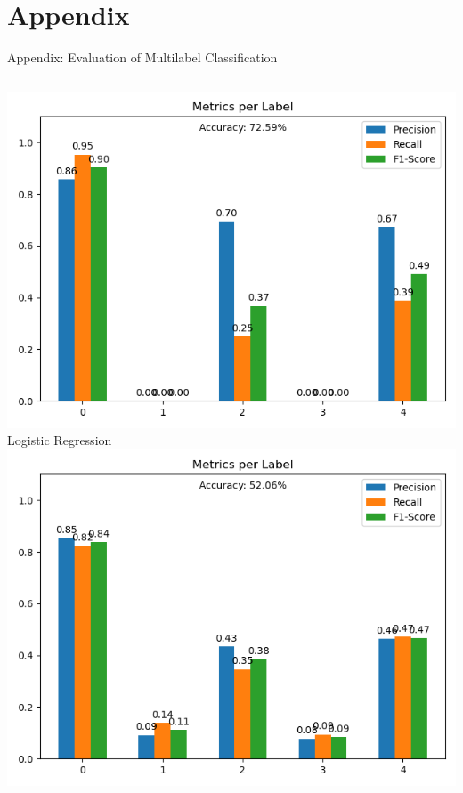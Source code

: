 \section{Appendix}

\begin{frame}{Appendix: Evaluation of Multilabel Classification}
    \begin{columns}[t,onlytextwidth]
        \centering
        \includegraphics[width=\textwidth]{figures/evaluation_lr_multilabel.png}\\
        Logistic Regression
        \centering
        \includegraphics[width=\textwidth]{figures/evaluation_lsvm_multilabel.png}\\

\end{columns}
\end{frame}
